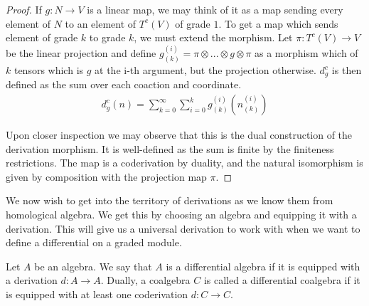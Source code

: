 \documentclass[../thesis.tex]{subfiles}
\begin{document}
\begin{proof}
                If $g: N \rightarrow V$ is a linear map, we may think of it as a map sending every element of $N$ to an element of $T^c(V)$ of grade $1$. To get a map which sends element of grade $k$ to grade $k$, we must extend the morphism. Let $\pi : T^c(V) \rightarrow V$ be the linear projection and define $g_{(k)}^{(i)} = \pi\otimes ... \otimes g \otimes \pi$ as a morphism which of $k$ tensors which is $g$ at the i-th argument, but the projection otherwise. $d_g^c$ is then defined as the sum over each coaction and coordinate.
                \begin{align*}
                    d_g^c(n) = \sum_{k=0}^\infty \sum_{i=0}^k g_{(k)}^{(i)}(n_{(k)}^{(i)})
                \end{align*}
                
                Upon closer inspection we may observe that this is the dual construction of the derivation morphism. It is well-defined as the sum is finite by the finiteness restrictions. The map is a coderivation by duality, and the natural isomorphism is given by composition with the projection map $\pi$.
            \end{proof}

            We now wish to get into the territory of derivations as we know them from homological algebra. We get this by choosing an algebra and equipping it with a derivation. This will give us a universal derivation to work with when we want to define a differential on a graded module.

            \begin{definition}
                Let $A$ be an algebra. We say that $A$ is a differential algebra if it is equipped with a derivation $d:A\rightarrow A$. Dually, a coalgebra $C$ is called a differential coalgebra if it is equipped with at least one coderivation $d:C\rightarrow C$.
            \end{definition}
\end{document}
